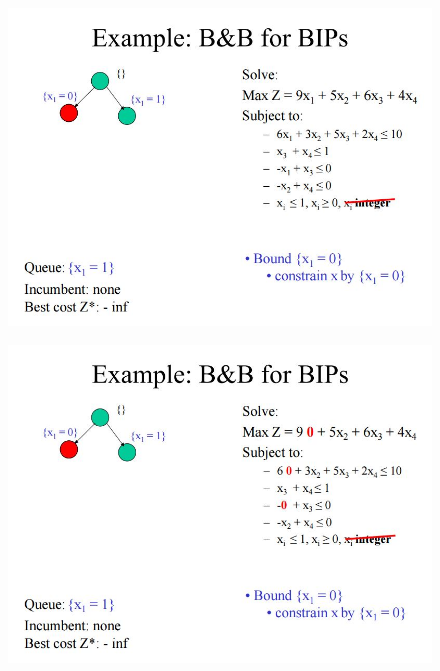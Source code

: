 \documentclass{beamer}
\begin{document}
\begin{frame}
	\begin{figure}
		\centering
		\includegraphics[width=1.0\linewidth]{BB-BIP/BB-BIP7}
	\end{figure}
\end{frame}
\begin{frame}
	\begin{figure}
		\centering
		\includegraphics[width=1.1\linewidth]{BB-BIP/BB-BIP8}
	\end{figure}
\end{frame}
\end{document}
